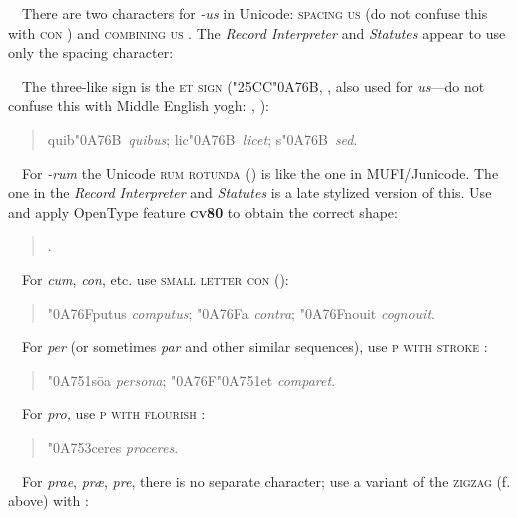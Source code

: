 \noindent{}\ \ There are two characters for \textit{{}-us} in Unicode:
\textsc{spacing us}  (do not
confuse this with \textsc{con} ) and \textsc{combining us} . The \textit{Record
Interpreter} and \textit{Statutes} appear to use only the spacing character:
\begin{quote}
\end{quote}
\noindent{}\ \ The three-like sign is the \textsc{et sign} (\char"25CC\char"0A76B, , also used for
\textit{us}{}---do not confuse this with Middle English yogh: , ):
\begin{quote}
quib\char"0A76B\ \textit{quibus}; lic\char"0A76B\ \textit{licet}; s\char"0A76B\ \textit{sed}.
\end{quote}
\noindent{}\ \ For \textit{{}-rum} the Unicode \textsc{rum rotunda} () is like the one in MUFI/Junicode.
The one in the \textit{Record Interpreter} and \textit{Statutes} is a late stylized version of
this. Use  and apply OpenType feature \textsc{\textbf{cv80}} to obtain the correct shape:
\begin{quote}
.
\end{quote}
\noindent{}\ \ For \textit{cum}, \textit{con}, etc. use \textsc{small letter con} ():
\begin{quote}
\char"0A76Fputus \textit{computus}; \char"0A76Fa \textit{contra}; \char"0A76Fnouit \textit{cognouit}.
\end{quote}
\noindent{}\ \ For \textit{per} (or sometimes \textit{par} and other similar sequences), use
\textsc{p with stroke} \unic{U+A751}:
\begin{quote}
\char"0A751s\={o}a \textit{persona}; \char"0A76F\char"0A751et \textit{comparet}.
\end{quote}
\noindent{}\ \  For \textit{pro,} use \textsc{p with flourish} :
\begin{quote}
\char"0A753ceres \textit{proceres}.
\end{quote}
\noindent{}\ \ For \textit{prae}, \textit{pr{\ae}}, \textit{pre}, there is no separate character;
use a variant of the \textsc{zigzag} (f. above) with \textex{p}:
